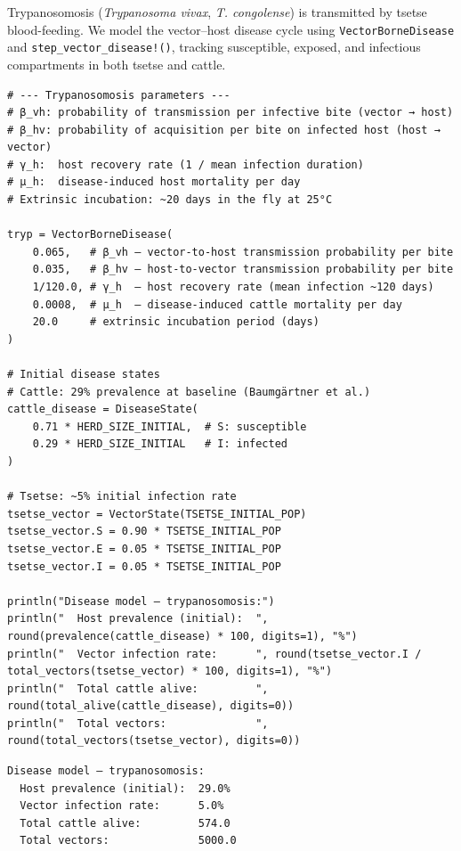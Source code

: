 \label{15788266325238567293}{}


Trypanosomosis (\emph{Trypanosoma vivax}, \emph{T. congolense}) is transmitted by tsetse blood-feeding. We model the vector–host disease cycle using \texttt{VectorBorneDisease} and \texttt{step\_vector\_disease!()}, tracking susceptible, exposed, and infectious compartments in both tsetse and cattle.




\begin{verbatim}
# --- Trypanosomosis parameters ---
# β_vh: probability of transmission per infective bite (vector → host)
# β_hv: probability of acquisition per bite on infected host (host → vector)
# γ_h:  host recovery rate (1 / mean infection duration)
# μ_h:  disease-induced host mortality per day
# Extrinsic incubation: ~20 days in the fly at 25°C

tryp = VectorBorneDisease(
    0.065,   # β_vh — vector-to-host transmission probability per bite
    0.035,   # β_hv — host-to-vector transmission probability per bite
    1/120.0, # γ_h  — host recovery rate (mean infection ~120 days)
    0.0008,  # μ_h  — disease-induced cattle mortality per day
    20.0     # extrinsic incubation period (days)
)

# Initial disease states
# Cattle: 29% prevalence at baseline (Baumgärtner et al.)
cattle_disease = DiseaseState(
    0.71 * HERD_SIZE_INITIAL,  # S: susceptible
    0.29 * HERD_SIZE_INITIAL   # I: infected
)

# Tsetse: ~5% initial infection rate
tsetse_vector = VectorState(TSETSE_INITIAL_POP)
tsetse_vector.S = 0.90 * TSETSE_INITIAL_POP
tsetse_vector.E = 0.05 * TSETSE_INITIAL_POP
tsetse_vector.I = 0.05 * TSETSE_INITIAL_POP

println("Disease model — trypanosomosis:")
println("  Host prevalence (initial):  ", round(prevalence(cattle_disease) * 100, digits=1), "%")
println("  Vector infection rate:      ", round(tsetse_vector.I / total_vectors(tsetse_vector) * 100, digits=1), "%")
println("  Total cattle alive:         ", round(total_alive(cattle_disease), digits=0))
println("  Total vectors:              ", round(total_vectors(tsetse_vector), digits=0))
\end{verbatim}




\begin{verbatim}
Disease model — trypanosomosis:
  Host prevalence (initial):  29.0%
  Vector infection rate:      5.0%
  Total cattle alive:         574.0
  Total vectors:              5000.0
\end{verbatim}




